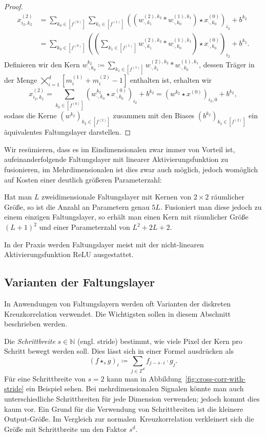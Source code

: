 \documentclass[paper=a4, 	%
		fontsize=11pt,
		abstract=true, 	%
		headsepline, 	%
		notitlepage	%
		]{scrartcl}
\theoremstyle{definition}
\newcommand{\Z}{\mathbb{Z}}
\newcommand{\N}{\mathbb{N}}
\newcommand{\bcdot}{\boldsymbol{\cdot}}
\newcommand{\fNat}[1]{[ #1 ]}
\begin{document}
\begin{proof}
\begin{align*}
        x^{(2)}_{i_2,k_2} 
        &= \sum_{k_0\in \fNat{f^{(0)}}}\sum_{k_1\in \fNat{f^{(1)}}}  \left( \left( w^{(2),k_2}_{\bcdot,k_1} * 
        w^{(1),k_1}_{\bcdot,k_0}\right) \star x^{(0)}_{\bcdot,k_0}
        \right)_{i_2} + b^{k_2} \\
        &= \sum_{k_0\in \fNat{f^{(0)}}} \left( \left(
            \sum_{k_1\in \fNat{f^{(1)}}}  w^{(2),k_2}_{\bcdot,k_1} * 
        w^{(1),k_1}_{\bcdot,k_0}\right) \star x^{(0)}_{\bcdot,k_0}
        \right)_{i_2} + b^{k_2}.
    \end{align*}
    Definieren wir den Kern $w^{k_2}_{\bcdot, k_0} \coloneqq \sum_{k_1\in \fNat{f^{(1)}}}  w^{(2),k_2}_{\bcdot,k_1} * 
    w^{(1),k_1}_{\bcdot,k_0}$, dessen Träger in der Menge $\bigtimes_{i=1}^d \fNat{m^{(1)}_i + m^{(2)}_i - 1}$ enthalten ist, erhalten wir
    \[
        x^{(2)}_{i_2, k_2}
        = \sum_{k_0\in \fNat{f^{(0)}}} \left( w^{k_2}_{\bcdot, k_0}\star x^{(0)}_{\bcdot,k_0}
        \right)_{i_2} + b^{k_2}
        = \left( w^{k_2} \star x^{(0)} \right)_{i_2, 0} + b^{k_2},
    \]
    sodass die Kerne $(w^{k_2})_{k_2\in\fNat{f^{(2)}}}$ zusammen mit den Biases $(b^{k_2})_{k_2\in\fNat{f^{(2)}}}$ ein äquivalentes Faltungslayer darstellen.
\end{proof}

Wir resümieren, dass es im Eindimensionalen zwar immer von Vorteil ist, aufeinanderfolgende Faltungslayer mit linearer Aktivierungsfunktion zu fusionieren, im Mehrdimensionalen ist dies zwar auch möglich, jedoch womöglich auf Kosten einer deutlich größeren Parameterzahl:

Hat man $L$ zweidimensionale Faltungslayer mit Kernen von $2\times 2$ räumlicher Größe, so ist die Anzahl an Parametern genau $5L$.
Fusioniert man diese jedoch zu einem einzigen Faltungslayer, so erhält man einen Kern mit räumlicher Größe $(L+1)^2$ und einer Parameterzahl von $L^2 + 2L + 2$.

In der Praxis werden Faltungslayer meist mit der nicht-linearen Aktivierungsfunktion ReLU ausgestattet.

\subsection{Varianten der Faltungslayer}\label{subsec:variants-of-cross-corr}

In Anwendungen von Faltungslayern werden oft Varianten der diskreten Kreuzkorrelation verwendet.
Die Wichtigsten sollen in diesem Abschnitt beschrieben werden.

Die \emph{Schrittbreite} $s\in\N$ (engl. \foreignlanguage{english}{stride}) bestimmt, wie viele Pixel der Kern pro Schritt bewegt werden soll.
Dies lässt sich in einer Formel ausdrücken als 
\[
    \left( f \star_s g \right)_i \coloneqq \sum_{j\in \Z^d} f_{j - s\cdot i} \cdot g_j.
\]
Für eine Schrittbreite von $s=2$ kann man in Abbildung~\ref{fig:cross-corr-with-stride} ein Beispiel sehen.
Bei mehrdimensionalen Signalen könnte man auch unterschiedliche Schrittbreiten für jede Dimension verwenden; jedoch kommt dies kaum vor.
Ein Grund für die Verwendung von Schrittbreiten ist die kleinere Output-Größe.
Im Vergleich zur \glqq normalen\grqq\ Kreuzkorrelation verkleinert sich die Größe mit Schrittbreite um den Faktor $s^d$.
\end{document}
